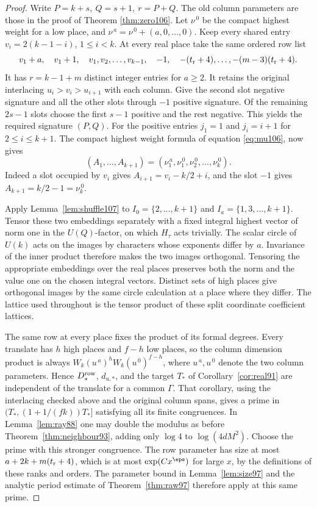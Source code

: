 \documentclass[a4paper,11pt]{article}
\theoremstyle{definition}
\theoremstyle{remark}
\numberwithin{equation}{section}
\begin{document}
\begin{proof}
Write \(P=k+s,\ Q=s+1,\ r=P+Q\). The old column parameters are
those in the proof of
Theorem \ref{thm:zero106}.
Let \(\nu^{\,0}\) be the compact highest weight for a low place,
and \(\nu^{\,a}=\nu^{\,0}+(a,0,\ldots,0)\). Keep every shared
entry \(v_i=2(k-1-i)\), \(1\le i<k\). At every real place take
the same ordered row list
\[
 v_1+a,\quad v_1+1,\quad v_1,v_2,\ldots,v_{k-1},\quad
      -1,\quad -(t_{\rm r}+4),\ldots,-(m-3)(t_{\rm r}+4).
\]
It has \(r=k-1+m\) distinct integer entries for \(a\ge2\).
It retains the original interlacing
\(u_i>v_i>u_{i+1}\) with each column. Give the second slot
negative signature and all the other slots through \(-1\)
positive signature. Of the remaining \(2s-1\) slots choose
the first \(s-1\) positive and the rest negative. This yields
the required signature \((P,Q)\). For the positive entries
\(j_1=1\) and \(j_i=i+1\) for \(2\le i\le k+1\).
The compact highest weight formula of equation \ref{eq:mu106}, now gives
\[
          (A_1,\ldots,A_{k+1})=
  (\nu^{\,a}_1,\nu^{\,0}_1,\nu^{\,0}_2,\ldots,\nu^{\,0}_k).
\]
Indeed a slot occupied by \(v_i\) gives
\(A_{i+1}=v_i-k/2+i\), and the slot \(-1\) gives
\(A_{k+1}=k/2-1=\nu^{\,0}_k\).

Apply Lemma~\ref{lem:shuffle107} to \(I_0=\{2,\ldots,k+1\}\)
and \(I_a=\{1,3,\ldots,k+1\}\). Tensor these two embeddings
separately with a fixed integral highest vector of norm one
in the \(U(Q)\)-factor, on which \(H_\tau\) acts trivially.
The scalar circle of \(U(k)\) acts on the images by characters
whose exponents differ by \(a\). Invariance of the inner product
therefore makes the two images orthogonal. Tensoring the appropriate embeddings over the real
places preserves both the norm and the value one on the chosen
integral vectors. Distinct sets of high places give orthogonal
images by the same circle calculation at a place where they
differ. The lattice used throughout is the tensor product of
these split coordinate coefficient lattices.

The same row at every place fixes the product of its formal
degrees. Every translate has \(h\) high places and \(f-h\) low
places, so the column dimension product is always
\(W_k(u^{\,a})^h W_k(u^{\,0})^{f-h}\), where \(u^{\,a},u^{\,0}\)
denote the two column parameters. Hence \(D_*^{\rm row}\),
\(d_{u,*}\), and the target \(T_*\) of Corollary~\ref{cor:real91}
are independent of the translate for a common \(\Gamma\).
That corollary, using the interlacing checked above and the
original column spans, gives a prime in
\((T_*,(1+1/(fk))T_*]\) satisfying all its finite congruences.
In Lemma~\ref{lem:ray88} one may double the modulus as before
Theorem~\ref{thm:neighbour93}, adding only \(\log 4\) to
\(\log(4dM^2)\). Choose the prime with this stronger congruence.
The row parameter has size at most \(a+2k+m(t_{\rm r}+4)\),
which is at most \(\exp(Cx^\eps)\) for large \(x\), by the
definitions of these ranks and orders. The parameter bound
in Lemma~\ref{lem:size97} and the analytic period estimate of
Theorem~\ref{thm:raw97} therefore apply at this same prime.
\end{proof}
\end{document}
